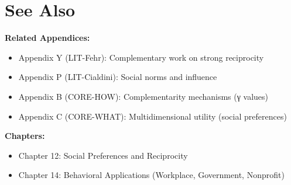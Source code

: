 \documentclass[11pt]{article}
\begin{document}
\section*{See Also}

\textbf{Related Appendices:}
\begin{itemize}
    \item Appendix Y (LIT-Fehr): Complementary work on strong reciprocity
    \item Appendix P (LIT-Cialdini): Social norms and influence
    \item Appendix B (CORE-HOW): Complementarity mechanisms (γ values)
    \item Appendix C (CORE-WHAT): Multidimensional utility (social preferences)
\end{itemize}

\textbf{Chapters:}
\begin{itemize}
    \item Chapter 12: Social Preferences and Reciprocity
    \item Chapter 14: Behavioral Applications (Workplace, Government, Nonprofit)
\end{itemize}

\end{document}
